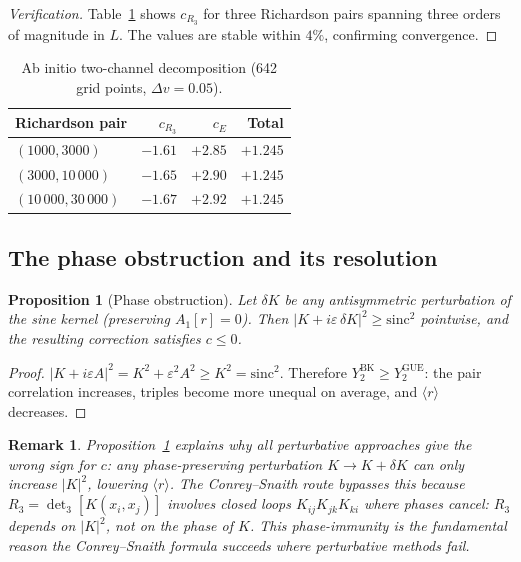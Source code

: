 \documentclass[10pt]{article}
\newtheorem{proposition}[theorem]{Proposition}
\newtheorem{remark}[theorem]{Remark}
\begin{document}
\begin{proof}[Verification]
Table~\ref{tab:channels} shows $c_{R_3}$ for three Richardson pairs
spanning three orders of magnitude in $L$. The values are stable within
$4\%$, confirming convergence.
\end{proof}

\begin{table}[h]
\centering
\caption{Ab initio two-channel decomposition (642 grid points,
$\Delta v = 0.05$).}
\label{tab:channels}
\begin{tabular}{lrrr}
\toprule
Richardson pair & $c_{R_3}$ & $c_E$ & Total \\
\midrule
$(1000, 3000)$ & $-1.61$ & $+2.85$ & $+1.245$ \\
$(3000, 10\,000)$ & $-1.65$ & $+2.90$ & $+1.245$ \\
$(10\,000, 30\,000)$ & $-1.67$ & $+2.92$ & $+1.245$ \\
\bottomrule
\end{tabular}
\end{table}

\subsection{The phase obstruction and its resolution}

\begin{proposition}[Phase obstruction]\label{prop:phase}
Let $\delta K$ be any antisymmetric perturbation of the sine kernel
(preserving $A_1[r] = 0$). Then
$|K + i\varepsilon\,\delta K|^2 \geq \mathrm{sinc}^2$ pointwise, and the
resulting correction satisfies $c \leq 0$.
\end{proposition}

\begin{proof}
$|K + i\varepsilon A|^2 = K^2 + \varepsilon^2 A^2 \geq K^2 =
\mathrm{sinc}^2$. Therefore $Y_2^{\mathrm{BK}} \geq Y_2^{\mathrm{GUE}}$:
the pair correlation increases, triples become more unequal on average, and
$\langle r\rangle$ decreases.
\end{proof}

\begin{remark}
Proposition~\ref{prop:phase} explains why all perturbative approaches give
the wrong sign for $c$: any phase-preserving perturbation $K \to K + \delta K$
can only increase $|K|^2$, lowering $\langle r\rangle$. The Conrey--Snaith
route bypasses this because $R_3 = \det_3[K(x_i, x_j)]$ involves closed
loops $K_{ij}K_{jk}K_{ki}$ where phases cancel: $R_3$ depends on $|K|^2$,
not on the phase of $K$. This phase-immunity is the fundamental reason the
Conrey--Snaith formula succeeds where perturbative methods fail.
\end{remark}
\end{document}
